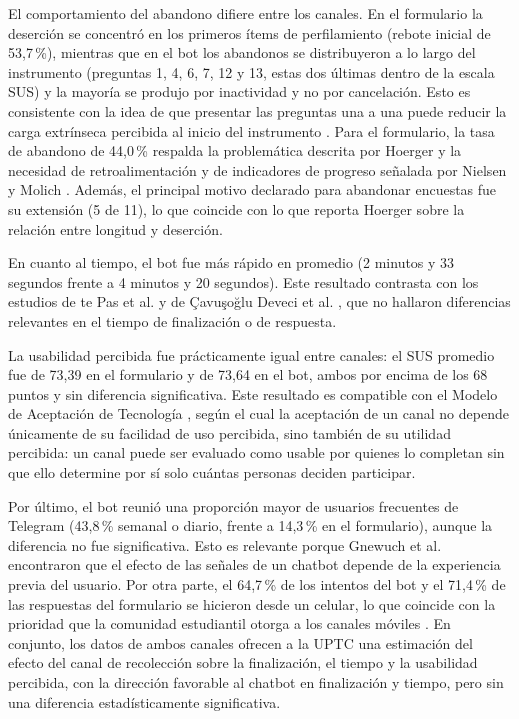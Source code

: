\documentclass[12pt,letterpaper]{article}
\begin{document}
El comportamiento del abandono difiere entre los canales. En el formulario la deserción se concentró en los primeros ítems de perfilamiento (rebote inicial de 53,7\,\%), mientras que en el bot los abandonos se distribuyeron a lo largo del instrumento (preguntas 1, 4, 6, 7, 12 y 13, estas dos últimas dentro de la escala SUS) y la mayoría se produjo por inactividad y no por cancelación. Esto es consistente con la idea de que presentar las preguntas una a una puede reducir la carga extrínseca percibida al inicio del instrumento \cite{sweller1994, nielsen1990}. Para el formulario, la tasa de abandono de 44,0\,\% respalda la problemática descrita por Hoerger \cite{hoerger2010} y la necesidad de retroalimentación y de indicadores de progreso señalada por Nielsen y Molich \cite{nielsen1990}. Además, el principal motivo declarado para abandonar encuestas fue su extensión (5 de 11), lo que coincide con lo que reporta Hoerger sobre la relación entre longitud y deserción.

En cuanto al tiempo, el bot fue más rápido en promedio (2 minutos y 33 segundos frente a 4 minutos y 20 segundos). Este resultado contrasta con los estudios de te Pas et al. \cite{tepas2020} y de Çavuşoğlu Deveci et al. \cite{devecifuchs2026}, que no hallaron diferencias relevantes en el tiempo de finalización o de respuesta.

La usabilidad percibida fue prácticamente igual entre canales: el SUS promedio fue de 73,39 en el formulario y de 73,64 en el bot, ambos por encima de los 68 puntos y sin diferencia significativa. Este resultado es compatible con el Modelo de Aceptación de Tecnología \cite{davis1989}, según el cual la aceptación de un canal no depende únicamente de su facilidad de uso percibida, sino también de su utilidad percibida: un canal puede ser evaluado como usable por quienes lo completan sin que ello determine por sí solo cuántas personas deciden participar.

Por último, el bot reunió una proporción mayor de usuarios frecuentes de Telegram (43,8\,\% semanal o diario, frente a 14,3\,\% en el formulario), aunque la diferencia no fue significativa. Esto es relevante porque Gnewuch et al. \cite{gnewuch2022} encontraron que el efecto de las señales de un chatbot depende de la experiencia previa del usuario. Por otra parte, el 64,7\,\% de los intentos del bot y el 71,4\,\% de las respuestas del formulario se hicieron desde un celular, lo que coincide con la prioridad que la comunidad estudiantil otorga a los canales móviles \cite{harley2007}. En conjunto, los datos de ambos canales ofrecen a la UPTC una estimación del efecto del canal de recolección sobre la finalización, el tiempo y la usabilidad percibida, con la dirección favorable al chatbot en finalización y tiempo, pero sin una diferencia estadísticamente significativa.
\end{document}
